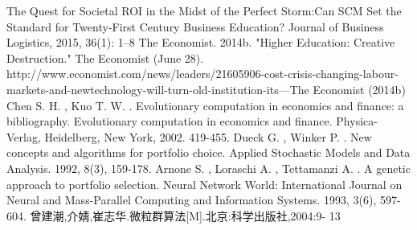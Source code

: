 \documentclass{mcmthesis}
\begin{document}
\begin{thebibliography}{99}
     The Quest for Societal ROI in the Midst of the Perfect Storm:Can SCM Set the Standard for Twenty-First Century Business Education? Journal of Business Logistics, 2015, 36(1): 1–8\label{1}
     The Economist. 2014b. "Higher Education: Creative Destruction." The Economist (June 28). http://www.economist.com/news/leaders/21605906-cost-crisis-changing-labour-markets-and-newtechnology-will-turn-old-institution-its—The Economist (2014b)\label{2}
      Chen S. H. , Kuo T. W. . Evolutionary computation in economics and finance: a bibliography.  Evolutionary  computation  in  economics  and  finance. Physica-Verlag, Heidelberg, New York, 2002. 419-455.\label{3}
     Dueck  G.  ,  Winker  P.  .  New  concepts  and  algorithms  for  portfolio  choice. Applied Stochastic Models and Data Analysis. 1992, 8(3), 159-178.\label{4}
     Arnone  S.  ,  Loraschi  A.  ,  Tettamanzi  A.  .  A  genetic  approach  to  portfolio selection.  Neural  Network  World:  International  Journal  on  Neural  and Mass-Parallel Computing and Information Systems. 1993, 3(6), 597-604.\label{5}
     曾建潮,介婧,崔志华.微粒群算法[M].北京:科学出版社,2004:9- 13\label{6}
    
\end{thebibliography}

\newpage

\end{document}
